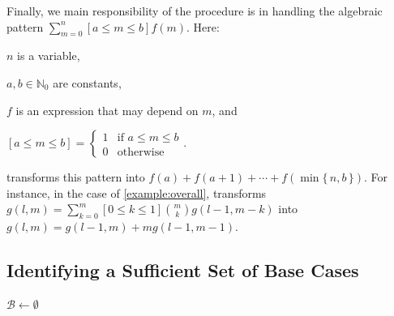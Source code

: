 \documentclass[letterpaper]{article} %
\theoremstyle{remark}
\theoremstyle{definition}
\begin{document}
Finally, we main responsibility of the \Simplify procedure is in handling the
algebraic pattern $\sum_{m=0}^{n}[a \le m \le b] f(m)$. Here:
\begin{enumerate*}[label=(\roman*)]
  \item $n$ is a variable,
  \item $a, b \in \mathbb{N}_{0}$ are constants,
  \item $f$ is an expression that may depend on $m$, and
  \item $[a \le m \le b] =
  \begin{cases}
    1 & \text{if $a \le m \le b$} \\
    0 & \text{otherwise}
  \end{cases}$.
\end{enumerate*}
\Simplify transforms this pattern into
$f(a) + f(a+1) + \cdots + f(\min\{\, n, b \,\})$. For instance, in the case of
\cref{example:overall}, \Simplify transforms
$g(l, m) = \sum_{k=0}^{m}[0 \le k \le 1]\binom{m}{k}g(l-1, m-k)$ into
$g(l, m) = g(l-1, m) + mg(l-1, m-1)$.

\subsection{Identifying a Sufficient Set of Base Cases}\label{sec:identifying}


\begin{algorithm}[t]
  \caption{\protect{}}\label{alg:findbasecases}

  $\mathcal{B} \gets \emptyset$\;
\end{algorithm}
\end{document}
